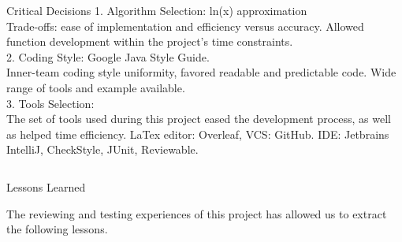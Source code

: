 \documentclass[final]{beamer}
\newlength{\onecolwid}
\newlength{\twocolwid}
\begin{document}
\begin{frame}[t]
\begin{columns}[t]
\begin{column}{\twocolwid}
\begin{columns}[t,totalwidth=\twocolwid]
\begin{column}{\onecolwid}
\begin{block}{Critical Decisions}
1. Algorithm Selection: ln(x) approximation\\
Trade-offs: ease of implementation and efficiency versus accuracy.
Allowed function development within the project's time constraints.
\[\]
2. Coding Style: Google Java Style Guide.\\
Inner-team coding style uniformity, favored readable and predictable code.
Wide range of tools and example available.
\[\]
3. Tools Selection:\\
The set of tools used during this project eased the development process, as well as helped time efficiency.
LaTex editor: Overleaf, VCS: GitHub.
IDE: Jetbrains IntelliJ, CheckStyle, JUnit, Reviewable.

\end{block}


\end{column} %

\end{columns} %


\begin{alertblock}{Lessons Learned}

The reviewing and testing experiences of this project has allowed us to extract the following lessons.

\end{alertblock} 


\begin{columns}[t,totalwidth=\twocolwid] %

\begin{column}{\onecolwid} %



\end{column}
\end{columns}
\end{column}
\end{columns}
\end{frame}
\end{document}
